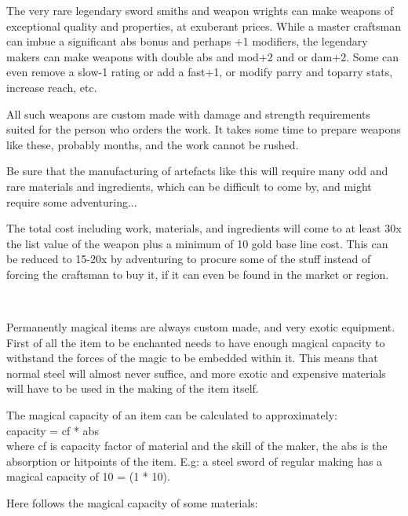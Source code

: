 \normalsize

The very rare legendary sword smiths and weapon wrights can make weapons of exceptional quality and properties, at exuberant prices. While a master craftsman can imbue a significant abs bonus and perhaps +1 modifiers, the legendary makers can make weapons with double abs and mod+2 and or dam+2. Some can even remove a slow-1 rating or add a fast+1, or modify parry and toparry stats, increase reach, etc.

All such weapons are custom made with damage and strength requirements suited for the person who orders the work. It takes some time to prepare weapons like these, probably months, and the work cannot be rushed.

Be sure that the manufacturing of artefacts like this will require many odd and rare materials and ingredients, which can be difficult to come by, and might require some adventuring...

The total cost including work, materials, and ingredients will come to at least 30x the list value of the weapon plus a minimum of 10 gold base line cost. This can be reduced to 15-20x by adventuring to procure some of the stuff instead of forcing the craftsman to buy it, if it can even be found in the market or region.

\

Permanently magical items are always custom made, and very exotic equipment.
First of all the item to be enchanted needs to have enough magical capacity to withstand the forces of the magic to be embedded within it. This means that normal steel will almost never suffice, and more exotic and expensive materials will have to be used in the making of the item itself.

The magical capacity of an item can be calculated to approximately: \\
capacity = cf * abs \\
where cf is capacity factor of material and the skill of the maker, the abs is the absorption or hitpoints of the item.
E.g: a steel sword of regular making has a magical capacity of 10 = (1 * 10).

Here follows the magical capacity of some materials:

